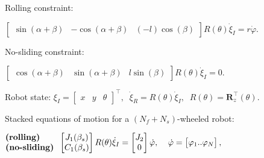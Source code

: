 \documentclass[landscape]{article}
\newcommand{\vmspace}{\vspace{-7pt}}
\newcommand{\vpspace}{\vspace{5pt}}
\begin{document}
\begin{multicols}{3}
\begin{minipage}{\columnwidth}
  Rolling constraint:
  \vmspace
  \begin{center}
    $\left[\begin{matrix}
      \sin(\alpha + \beta) & -\cos(\alpha + \beta) & (-l) \cos(\beta)
    \end{matrix}\right]
    R(\theta)\dot\xi_I
    =
    r \dot \varphi.$
  \end{center}
\end{minipage}

\begin{minipage}{\columnwidth}
  No-sliding constraint:
  \vmspace
  \begin{center}
    $\left[\begin{matrix}
      \cos(\alpha + \beta) & \sin(\alpha + \beta) & l \sin(\beta)
    \end{matrix}\right]
    R(\theta)\dot\xi_I
    =
    0.$
  \end{center}
\end{minipage}

\begin{minipage}{\columnwidth}
  Robot state:
    $\xi_I
    =
    \left[\begin{matrix}
      x & y & \theta
    \end{matrix}\right]^\intercal,
    \;\;
    \dot\xi_R = R(\theta)\dot\xi_I,
    \;\;
    R(\theta) = \mathbf R_z^\intercal(\theta).$
\end{minipage}

\vpspace

\begin{minipage}{\columnwidth}
  Stacked equations of motion for a $(N_f+N_s)$-wheeled robot:
  \vmspace
  \begin{center}
    $\begin{matrix}
      \text{\textbf{(rolling)}}\;\;\;\;\;\; \\
      \text{\textbf{(no-sliding)}}
    \end{matrix}\;\;
    \left[\begin{matrix}
      J_1(\beta_s) \\
      C_1(\beta_s)
    \end{matrix}\right]
    R(\theta)\dot\xi_I
    =
    \left[\begin{matrix}
      J_2 \\
      0
    \end{matrix}\right]
    \dot\varphi,\;\;\;\;
    \dot\varphi
    =
    \left[\begin{matrix}
      \varphi_1..\varphi_N
    \end{matrix}\right],$
  \end{center}
\end{minipage}


\end{multicols}
\end{document}
